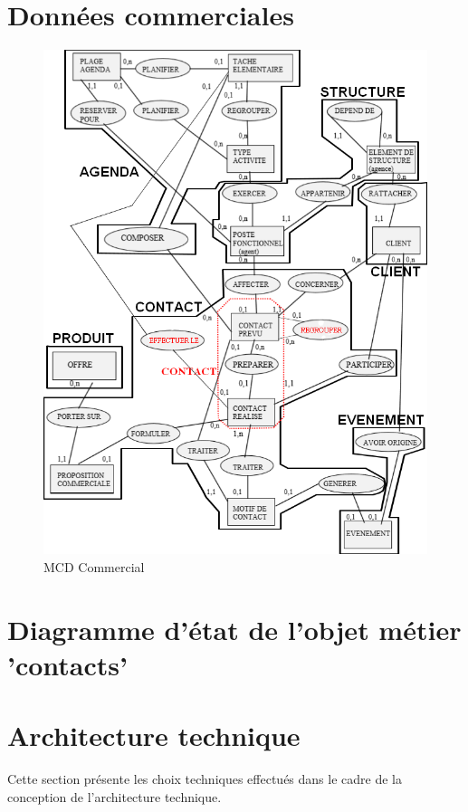 \section{Données commerciales}
\begin{figure}[h]
\centering
\includegraphics[width=\textwidth]{figures/mcd/MCD_Commercial}
\caption{MCD Commercial}
\end{figure}
\section{Diagramme d’état de l'objet métier 'contacts'}
\section{Architecture technique}


Cette section présente les choix techniques effectués dans le cadre de la conception de l'architecture technique.

